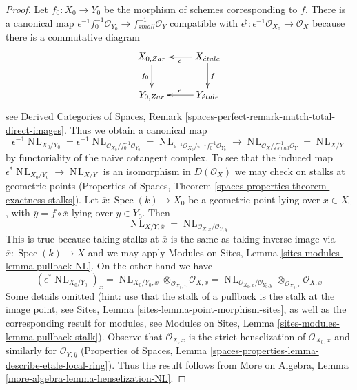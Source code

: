 \documentclass[10pt,a4paper]{amsart}
\theoremstyle{plain}
\theoremstyle{definition}
\theoremstyle{remark}
\numberwithin{equation}{subsection}
\def\Spec{\mathop{\mathrm{Spec}}}
\def\NL{\mathop{N\!L}\nolimits}
\def\etale{{\acute{e}tale}}
\begin{document}
\begin{proof}
Let $f_0 : X_0 \to Y_0$ be the morphism of schemes corresponding to $f$.
There is a canonical map
$\epsilon^{-1}f_0^{-1}\mathcal{O}_{Y_0} \to f_{small}^{-1}\mathcal{O}_Y$
compatible with
$\epsilon^\sharp : \epsilon^{-1}\mathcal{O}_{X_0} \to \mathcal{O}_X$
because there is a commutative diagram
$$
\xymatrix{
X_{0, Zar} \ar[d]_{f_0} & X_\etale \ar[l]^\epsilon \ar[d]^f \\
Y_{0, Zar} & Y_\etale \ar[l]_\epsilon
}
$$
see Derived Categories of Spaces, Remark
\ref{spaces-perfect-remark-match-total-direct-images}.
Thus we obtain a canonical map
$$
\epsilon^{-1}\NL_{X_0/Y_0} =
\epsilon^{-1}\NL_{\mathcal{O}_{X_0}/f_0^{-1}\mathcal{O}_{Y_0}} =
\NL_{\epsilon^{-1}\mathcal{O}_{X_0}/\epsilon^{-1}f_0^{-1}\mathcal{O}_{Y_0}}
\to
\NL_{\mathcal{O}_X/f^{-1}_{small}\mathcal{O}_Y} = \NL_{X/Y}
$$
by functoriality of the naive cotangent complex.
To see that the induced map $\epsilon^*\NL_{X_0/Y_0} \to \NL_{X/Y}$ is an
isomorphism in $D(\mathcal{O}_X)$ we may check on stalks at geometric points
(Properties of Spaces, Theorem
\ref{spaces-properties-theorem-exactness-stalks}).
Let $\overline{x} : \Spec(k) \to X_0$
be a geometric point lying over $x \in X_0$, with
$\overline{y} = f \circ \overline{x}$ lying over $y \in Y_0$. Then
$$
\NL_{X/Y, \overline{x}} =
\NL_{\mathcal{O}_{X, \overline{x}}/\mathcal{O}_{Y, \overline{y}}}
$$
This is true because taking stalks at $\overline{x}$ is the same
as taking inverse image via $\overline{x} : \Spec(k) \to X$
and we may apply Modules on Sites, Lemma \ref{sites-modules-lemma-pullback-NL}.
On the other hand we have
$$
(\epsilon^*\NL_{X_0/Y_0})_{\overline{x}} =
\NL_{X_0/Y_0, x} \otimes_{\mathcal{O}_{X_0, x}}
\mathcal{O}_{X, \overline{x}} =
\NL_{\mathcal{O}_{X_0, x}/\mathcal{O}_{Y_0, y}}
\otimes_{\mathcal{O}_{X_0, x}} \mathcal{O}_{X, \overline{x}}
$$
Some details omitted (hint: use that the stalk of a pullback
is the stalk at the image point, see
Sites, Lemma \ref{sites-lemma-point-morphism-sites},
as well as the corresponding result for modules, see
Modules on Sites, Lemma \ref{sites-modules-lemma-pullback-stalk}).
Observe that $\mathcal{O}_{X, \overline{x}}$ is the strict
henselization of $\mathcal{O}_{X_0, x}$ and similarly
for $\mathcal{O}_{Y, \overline{y}}$
(Properties of Spaces, Lemma
\ref{spaces-properties-lemma-describe-etale-local-ring}).
Thus the result follows from
More on Algebra,
Lemma \ref{more-algebra-lemma-henselization-NL}.
\end{proof}
\end{document}

